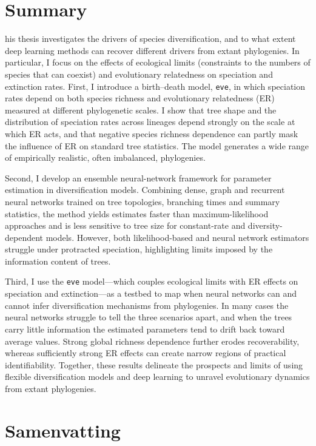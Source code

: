 \chapter*{Summary}

his thesis investigates the drivers of species diversification, and to what extent deep learning methods can recover different drivers from extant phylogenies. In particular, I focus on the effects of ecological limits (constraints to the numbers of species that can coexist) and evolutionary relatedness on speciation and extinction rates. 
First, I introduce a birth--death model, \texttt{eve}, in which speciation rates depend on both species richness and evolutionary relatedness (ER) measured at different phylogenetic scales. 
I show that tree shape and the distribution of speciation rates across lineages depend strongly on the scale at which ER acts, and that negative species richness dependence can partly mask the influence of ER on standard tree statistics. The model generates a wide range of empirically realistic, often imbalanced, phylogenies.

Second, I develop an ensemble neural-network framework for parameter estimation in diversification models. 
Combining dense, graph and recurrent neural networks trained on tree topologies, branching times and summary statistics, the method yields estimates faster than maximum-likelihood approaches and is less sensitive to tree size for constant-rate and diversity-dependent models. However, both likelihood-based and neural network estimators struggle under protracted speciation, highlighting limits imposed by the information content of trees.

Third, I use the \texttt{eve} model---which couples ecological limits with ER effects on speciation and extinction---as a testbed to map when neural networks can and cannot infer diversification mechanisms from phylogenies. 
In many cases the neural networks struggle to tell the three scenarios apart, and when the trees carry little information the estimated parameters tend to drift back toward average values. Strong global richness dependence further erodes recoverability, whereas sufficiently strong ER effects can create narrow regions of practical identifiability. Together, these results delineate the prospects and limits of using flexible diversification models and deep learning to unravel evolutionary dynamics from extant phylogenies.

\chapter*{Samenvatting}

